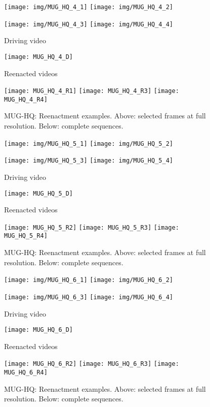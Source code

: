 \begin{figure*}
\texttt{[image: img/MUG\_HQ\_4\_1]}
\texttt{[image: img/MUG\_HQ\_4\_2]}

\vspace{.8mm}
\texttt{[image: img/MUG\_HQ\_4\_3]}
\texttt{[image: img/MUG\_HQ\_4\_4]}

\centering
Driving video

\texttt{[image: MUG\_HQ\_4\_D]}

Reenacted videos

\texttt{[image: MUG\_HQ\_4\_R1]}
\texttt{[image: MUG\_HQ\_4\_R3]}
\texttt{[image: MUG\_HQ\_4\_R4]}

\caption{MUG-HQ: Reenactment examples. Above: selected frames at full resolution. Below: complete sequences.}
\label{fig:hq4}
\end{figure*}

\begin{figure*}
\texttt{[image: img/MUG\_HQ\_5\_1]}
\texttt{[image: img/MUG\_HQ\_5\_2]}

\vspace{.8mm}
\texttt{[image: img/MUG\_HQ\_5\_3]}
\texttt{[image: img/MUG\_HQ\_5\_4]}

\centering
Driving video

\texttt{[image: MUG\_HQ\_5\_D]}

Reenacted videos

\texttt{[image: MUG\_HQ\_5\_R2]}
\texttt{[image: MUG\_HQ\_5\_R3]}
\texttt{[image: MUG\_HQ\_5\_R4]}

\caption{MUG-HQ: Reenactment examples. Above: selected frames at full resolution. Below: complete sequences.}
\label{fig:hq5}
\end{figure*}

\begin{figure*}
\texttt{[image: img/MUG\_HQ\_6\_1]}
\texttt{[image: img/MUG\_HQ\_6\_2]}

\vspace{.8mm}
\texttt{[image: img/MUG\_HQ\_6\_3]}
\texttt{[image: img/MUG\_HQ\_6\_4]}

\centering
Driving video

\texttt{[image: MUG\_HQ\_6\_D]}

Reenacted videos

\texttt{[image: MUG\_HQ\_6\_R2]}
\texttt{[image: MUG\_HQ\_6\_R3]}
\texttt{[image: MUG\_HQ\_6\_R4]}

\caption{MUG-HQ: Reenactment examples. Above: selected frames at full resolution. Below: complete sequences.}
\label{fig:hq6}
\end{figure*}

